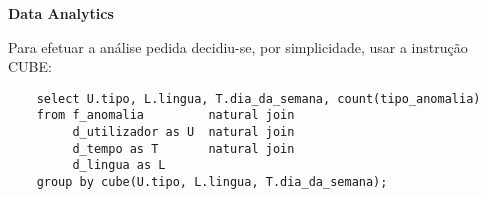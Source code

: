 \documentclass[12pt]{report}
\begin{document}
    
    \Large
    \textbf{Data Analytics}\\
    \normalsize
    \par Para efetuar a análise pedida decidiu-se, por simplicidade, usar a instrução CUBE:
    \small \begin{verbatim}
    select U.tipo, L.lingua, T.dia_da_semana, count(tipo_anomalia) 
    from f_anomalia         natural join
         d_utilizador as U  natural join
         d_tempo as T       natural join 
         d_lingua as L 
    group by cube(U.tipo, L.lingua, T.dia_da_semana);
    \end{verbatim}\normalsize
\end{document}
